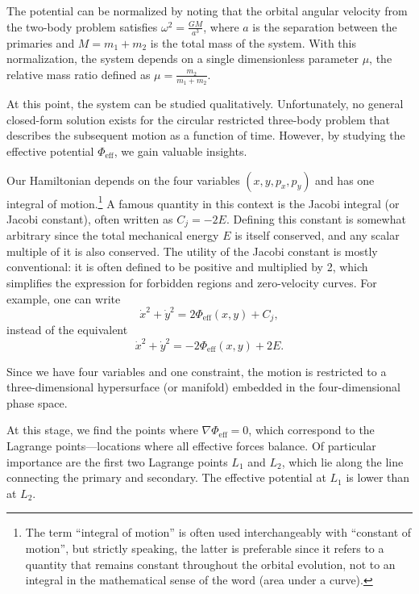         The potential can be normalized by noting that the orbital angular velocity from the two-body problem satisfies \(\omega^2 = \frac{G M}{a^3}\), where \(a\) is the separation between the primaries and \(M = m_1 + m_2\) is the total mass of the system. With this normalization, the system depends on a single dimensionless parameter \(\mu\), the relative mass ratio defined as \(\mu = \frac{m_2}{m_1 + m_2}\).

        At this point, the system can be studied qualitatively. Unfortunately, no general closed-form solution exists for the circular restricted three-body problem that describes the subsequent motion as a function of time. However, by studying the effective potential \(\Phi_\mathrm{eff}\), we gain valuable insights.

        Our Hamiltonian depends on the four variables \((x, y, p_x, p_y)\) and has one integral of motion.\footnote{The term ``integral of motion'' is often used interchangeably with ``constant of motion'', but strictly speaking, the latter is preferable since it refers to a quantity that remains constant throughout the orbital evolution, not to an integral in the mathematical sense of the word (area under a curve).} A famous quantity in this context is the Jacobi integral (or Jacobi constant), often written as \(C_j = -2E\). Defining this constant is somewhat arbitrary since the total mechanical energy \(E\) is itself conserved, and any scalar multiple of it is also conserved. The utility of the Jacobi constant is mostly conventional: it is often defined to be positive and multiplied by 2, which simplifies the expression for forbidden regions and zero-velocity curves. For example, one can write
        \[
        \dot{x}^2 + \dot{y}^2 = 2 \Phi_\mathrm{eff}(x,y) + C_j,
        \]
        instead of the equivalent
        \[
        \dot{x}^2 + \dot{y}^2 = -2 \Phi_\mathrm{eff}(x,y) + 2E.
        \]
        

        Since we have four variables and one constraint, the motion is restricted to a three-dimensional hypersurface (or manifold) embedded in the four-dimensional phase space.

        At this stage, we find the points where \(\nabla \Phi_\mathrm{eff} = 0\), which correspond to the Lagrange points—locations where all effective forces balance. Of particular importance are the first two Lagrange points \(L_1\) and \(L_2\), which lie along the line connecting the primary and secondary. The effective potential at \(L_1\) is lower than at \(L_2\).

